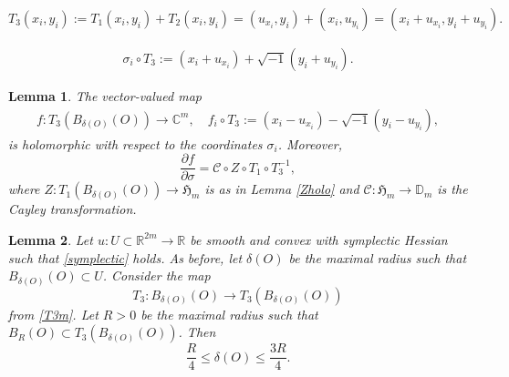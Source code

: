 \documentclass[10pt,a4paper]{amsart}
\newtheorem{lemma}{Lemma}
\newcommand{\C}{\mathbb{C}}
\newcommand{\R}{\mathbb{R}}
\renewcommand{\leq}{\leqslant}
\begin{document}
\begin{equation}\label{T3m}
     T_{3}(x_{i},y_{i}) := T_{1}(x_{i},y_{i})+T_{2}(x_{i},y_{i})= (u_{x_{i}},y_{i})+(x_{i},u_{y_{i}})= (x_{i}+u_{x_{i}},y_{i}+u_{y_{i}}).
\end{equation}

\begin{align}\label{def_sigma}
\sigma_{i} \circ T_3:=(x_{i}+u_{x_{i}})+\sqrt{-1}(y_{i}+u_{y_{i}}).
 \end{align}

\begin{lemma}\label{Holchart1}
    The vector-valued map
    \begin{align}\label{def_f}f:T_{3}(B_{\delta(O)}(O))\to \C^{m}, \quad f_{i} \circ T_3 :=(x_{i}-u_{x_{i}})-\sqrt{-1}(y_{i}-u_{y_{i}}),\end{align}
    is holomorphic with respect to the coordinates $\sigma_i$. Moreover,
    $$\frac{\partial f}{\partial \sigma}=\mathscr{C} \circ Z \circ T_1 \circ T_3^{-1},$$
    where $Z: T_1(B_{\delta(O)}(O)) \to \mathfrak{H}_m$ is as in Lemma \ref{Zholo} and $\mathscr{C}: \mathfrak{H}_m \to \mathbb{D}_m$ is the Cayley transformation.
\end{lemma}

\begin{lemma}\label{3NN}
Let $u:U\subset\R^{2m}\to\R$ be smooth and convex with symplectic Hessian such that \eqref{symplectic} holds. As before, let $\delta(O)$ be the maximal radius such that $B_{\delta(O)}(O)\subset U$. Consider the map $$T_{3}:B_{\delta(O)}(O)\to T_{3}(B_{\delta(O)}(O))$$
from \eqref{T3m}. Let $R>0$ be the maximal radius such that $B_R(O)\subset T_{3}(B_{\delta(O)}(O))$. Then
$$\frac{R}{4}\leq \delta(O)\leq \frac{3R}{4}.$$
\end{lemma}
\end{document}
